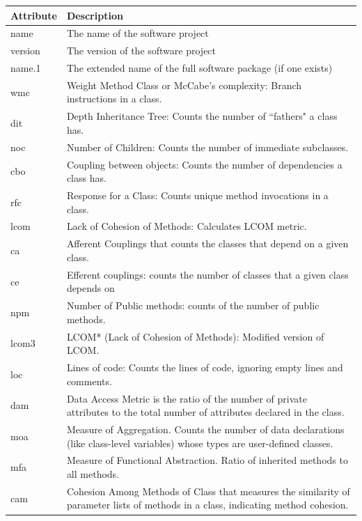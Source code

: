 \documentclass[]{svjour3}
\begin{document}
\begin{table}
\begin{tabular}{|l|p{10.65cm}|} %
\hline
\textbf{Attribute} & \textbf{Description} \\ \hline
name & The name of the software project \\ \hline
version & The version of the software project \\ \hline
name.1 & The extended name of the full software package (if one exists) \\ \hline
wmc & Weight Method Class or McCabe's complexity: Branch instructions in a class. \\ \hline
dit & Depth Inheritance Tree: Counts the number of ``fathers" a class has. \\ \hline
noc & Number of Children: Counts the number of immediate subclasses. \\ \hline
cbo & Coupling between objects: Counts the number of dependencies a class has. \\ \hline
rfc & Response for a Class: Counts unique method invocations in a class. \\ \hline
lcom & Lack of Cohesion of Methods: Calculates LCOM metric. \\ \hline
ca & Afferent Couplings that counts the  classes that depend on a given class. \\ \hline
ce & Efferent couplings: counts the number of classes that a given class depends on\\ \hline
npm & Number of Public methods: counts of the number of public methods. \\ \hline
lcom3 & LCOM* (Lack of Cohesion of Methods): Modified version of LCOM. \\ \hline
loc & Lines of code: Counts the lines of code, ignoring empty lines and comments. \\ \hline
dam & Data Access Metric is the ratio of the number of private attributes to the total number of attributes declared in the
class. \\ \hline
moa & Measure of Aggregation. Counts the number of data declarations (like class-level variables) whose types are user-defined classes.\\ \hline
mfa & Measure of Functional Abstraction. Ratio of inherited methods to all methods. \\ \hline
cam & Cohesion Among Methods of Class that measures the similarity of parameter lists of methods in a class, indicating method cohesion.\\ \hline

\end{tabular}
\end{table}
\end{document}
